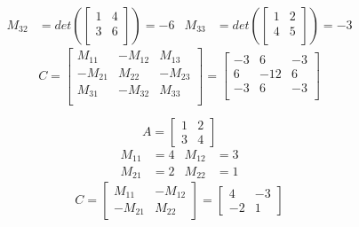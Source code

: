 \begin{example}
\begin{align*}
        M_{32} & = det(\begin{bmatrix}
            1 & 4 \\
            3 & 6 \\
        \end{bmatrix}) = -6 &
        M_{33} & = det(\begin{bmatrix}
            1 & 2 \\
            4 & 5 \\
        \end{bmatrix}) = -3
    \end{align*}
    \begin{equation*}
        C = \begin{bmatrix}
            M_{11}  & -M_{12} & M_{13}  \\
            -M_{21} & M_{22}  & -M_{23} \\
            M_{31}  & -M_{32} & M_{33}  \\
        \end{bmatrix} = \begin{bmatrix}
            -3 & 6   & -3 \\
            6  & -12 & 6  \\
            -3 & 6   & -3 \\
        \end{bmatrix}
    \end{equation*}
\end{example}
\begin{example}
    \begin{equation*}
        A = \begin{bmatrix}
            1 & 2 \\ 3 & 4
        \end{bmatrix}
    \end{equation*}
    \begin{align*}
        M_{11} & = 4 & M_{12} & = 3 \\
        M_{21} & = 2 & M_{22} & = 1
    \end{align*}
    \begin{equation*}
        C = \begin{bmatrix}
            M_{11}  & -M_{12} \\
            -M_{21} & M_22
        \end{bmatrix} = \begin{bmatrix}
            4 & -3 \\ -2 & 1
        \end{bmatrix}
    \end{equation*}
\end{example}
